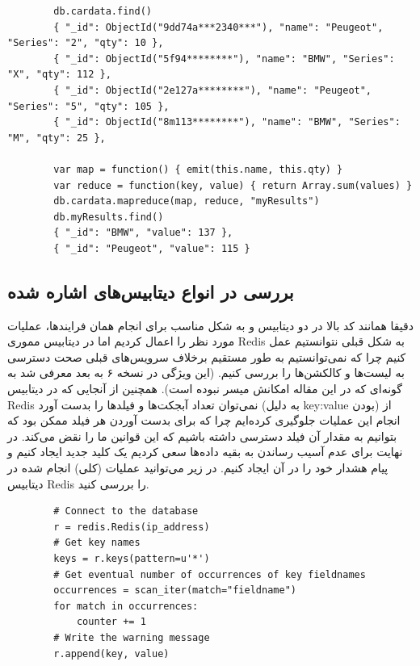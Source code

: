 \documentclass[10pt, a4paper]{article}
\begin{document}
\begin{LTR}
    \begin{lstlisting}
        db.cardata.find()
        { "_id": ObjectId("9dd74a***2340***"), "name": "Peugeot", "Series": "2", "qty": 10 },
        { "_id": ObjectId("5f94********"), "name": "BMW", "Series": "X", "qty": 112 },
        { "_id": ObjectId("2e127a********"), "name": "Peugeot", "Series": "5", "qty": 105 },
        { "_id": ObjectId("8m113********"), "name": "BMW", "Series": "M", "qty": 25 },

        var map = function() { emit(this.name, this.qty) }
        var reduce = function(key, value) { return Array.sum(values) } 
        db.cardata.mapreduce(map, reduce, "myResults")
        db.myResults.find()
        { "_id": "BMW", "value": 137 },
        { "_id": "Peugeot", "value": 115 }
    \end{lstlisting}
\end{LTR}

\subsection{بررسی در انواع دیتابیس‌های اشاره شده}

دقیقا همانند کد بالا در دو دیتابیس  و  به شکل
مناسب برای انجام همان فرایند‌ها، عملیات مورد نظر را اعمال کردیم اما در دیتابیس
مموری Redis به شکل قبلی نتوانستیم عمل کنیم چرا که نمی‌توانستیم به طور مستقیم
برخلاف سرویس‌های قبلی صحت دسترسی به لیست‌ها و کالکشن‌ها را بررسی کنیم. (این
ویژگی در نسخه ۶ به بعد معرفی شد به گونه‌ای که در این مقاله امکانش میسر نبوده
است). همچنین از آنجایی که در دیتابیس Redis نمی‌توان تعداد آبجکت‌ها و فیلد‌ها را
بدست آورد (به دلیل key:value بودن) از انجام این عملیات جلوگیری کرده‌ایم چرا که
برای بدست آوردن هر فیلد ممکن بود که بتوانیم به مقدار آن فیلد دسترسی داشته باشیم
که این قوانین ما را نقض می‌کند. در نهایت برای عدم آسیب رساندن به بقیه داده‌ها
سعی کردیم یک کلید جدید ایجاد کنیم و پیام هشدار خود را در آن ایجاد کنیم. در زیر
می‌توانید عملیات (کلی) انجام شده در دیتابیس Redis را بررسی کنید.

\begin{LTR}
    \begin{lstlisting}
        # Connect to the database
        r = redis.Redis(ip_address)
        # Get key names
        keys = r.keys(pattern=u'*')
        # Get eventual number of occurrences of key fieldnames
        occurrences = scan_iter(match="fieldname")
        for match in occurrences:
            counter += 1
        # Write the warning message
        r.append(key, value)
    \end{lstlisting}
\end{LTR}
\end{document}
